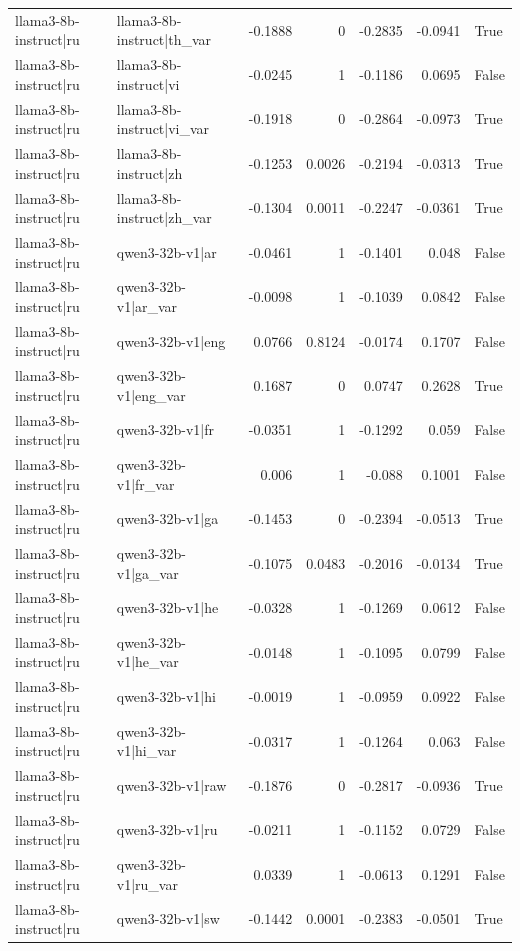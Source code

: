 \begin{table}
\begin{tabular}{l l r r r r l}
llama3-8b-instruct|ru & llama3-8b-instruct|th_var & -0.1888 & 0 & -0.2835 & -0.0941 & True \\
llama3-8b-instruct|ru & llama3-8b-instruct|vi & -0.0245 & 1 & -0.1186 & 0.0695 & False \\
llama3-8b-instruct|ru & llama3-8b-instruct|vi_var & -0.1918 & 0 & -0.2864 & -0.0973 & True \\
llama3-8b-instruct|ru & llama3-8b-instruct|zh & -0.1253 & 0.0026 & -0.2194 & -0.0313 & True \\
llama3-8b-instruct|ru & llama3-8b-instruct|zh_var & -0.1304 & 0.0011 & -0.2247 & -0.0361 & True \\
llama3-8b-instruct|ru & qwen3-32b-v1|ar & -0.0461 & 1 & -0.1401 & 0.048 & False \\
llama3-8b-instruct|ru & qwen3-32b-v1|ar_var & -0.0098 & 1 & -0.1039 & 0.0842 & False \\
llama3-8b-instruct|ru & qwen3-32b-v1|eng & 0.0766 & 0.8124 & -0.0174 & 0.1707 & False \\
llama3-8b-instruct|ru & qwen3-32b-v1|eng_var & 0.1687 & 0 & 0.0747 & 0.2628 & True \\
llama3-8b-instruct|ru & qwen3-32b-v1|fr & -0.0351 & 1 & -0.1292 & 0.059 & False \\
llama3-8b-instruct|ru & qwen3-32b-v1|fr_var & 0.006 & 1 & -0.088 & 0.1001 & False \\
llama3-8b-instruct|ru & qwen3-32b-v1|ga & -0.1453 & 0 & -0.2394 & -0.0513 & True \\
llama3-8b-instruct|ru & qwen3-32b-v1|ga_var & -0.1075 & 0.0483 & -0.2016 & -0.0134 & True \\
llama3-8b-instruct|ru & qwen3-32b-v1|he & -0.0328 & 1 & -0.1269 & 0.0612 & False \\
llama3-8b-instruct|ru & qwen3-32b-v1|he_var & -0.0148 & 1 & -0.1095 & 0.0799 & False \\
llama3-8b-instruct|ru & qwen3-32b-v1|hi & -0.0019 & 1 & -0.0959 & 0.0922 & False \\
llama3-8b-instruct|ru & qwen3-32b-v1|hi_var & -0.0317 & 1 & -0.1264 & 0.063 & False \\
llama3-8b-instruct|ru & qwen3-32b-v1|raw & -0.1876 & 0 & -0.2817 & -0.0936 & True \\
llama3-8b-instruct|ru & qwen3-32b-v1|ru & -0.0211 & 1 & -0.1152 & 0.0729 & False \\
llama3-8b-instruct|ru & qwen3-32b-v1|ru_var & 0.0339 & 1 & -0.0613 & 0.1291 & False \\
llama3-8b-instruct|ru & qwen3-32b-v1|sw & -0.1442 & 0.0001 & -0.2383 & -0.0501 & True \\

\end{tabular}
\end{table}
